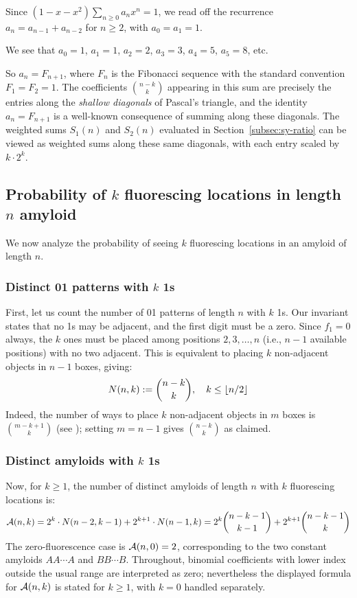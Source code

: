 \documentclass[referee,lineno,pdflatex,sn-mathphys-ay]{sn-jnl}
\DeclarePairedDelimiter\floor{\lfloor}{\rfloor}
\newcommand{\cA}{ {\cal A} }
\begin{document}
Since $(1-x-x^2)\sum_{n \ge 0} a_n x^n = 1$, we read off the recurrence $a_n = a_{n-1} + a_{n-2}$ for $n \ge 2$, with $a_0 = a_1 = 1$.

We see that $a_0 = 1$, $a_1 = 1$, $a_2 = 2$, $a_3 = 3$, $a_4 = 5$, $a_5 = 8$, etc.

So $a_n = F_{n+1}$, where $F_n$ is the Fibonacci sequence with the standard convention $F_1 = F_2 = 1$. The coefficients $\binom{n-k}{k}$ appearing in this sum are precisely the entries along the \textit{shallow diagonals} of Pascal's triangle, and the identity $a_n = F_{n+1}$ is a well-known consequence of summing along these diagonals. The weighted sums $S_1(n)$ and $S_2(n)$ evaluated in Section~\ref{subsec:sy-ratio} can be viewed as weighted sums along these same diagonals, with each entry scaled by $k \cdot 2^k$.

\subsection{Probability of $k$ fluorescing locations in length $n$ amyloid }

We now analyze the probability of seeing $k$ fluorescing locations in an amyloid of length $n$.


\subsubsection{Distinct 01 patterns with $k$ 1s}
First, let us count the number of 01 patterns of length $n$ with $k$ 1s. Our invariant states that no 1s may be adjacent, and the first digit must be a zero. Since $f_1 = 0$ always, the $k$ ones must be placed among positions $2, 3, \ldots, n$ (i.e., $n - 1$ available positions) with no two adjacent. This is equivalent to placing $k$ non-adjacent objects in $n - 1$ boxes, giving:
\[
N(n,k) := \binom{n-k}{k}, \quad k \leq \floor{n/2}
\]
Indeed, the number of ways to place $k$ non-adjacent objects in $m$ boxes is $\binom{m-k+1}{k}$ (see \citep[Exercise~1.34]{stanley2012}); setting $m = n - 1$ gives $\binom{n-k}{k}$ as claimed.


\subsubsection{Distinct amyloids with $k$ 1s}
Now, for $k \ge 1$, the number of distinct amyloids of length $n$ with $k$ fluorescing locations is:
\[
    \cA(n,k) = 2^k \cdot N(n-2,k-1) + 2^{k+1}  \cdot N(n-1,k) = 2^k \binom{n-k-1}{k-1} + 2^{k+1} \binom{n-k-1}{k}
\]
The zero-fluorescence case is $\cA(n,0) = 2$, corresponding to the two constant amyloids $AA\cdots A$ and $BB\cdots B$.
Throughout, binomial coefficients with lower index outside the usual range are interpreted as zero; nevertheless the displayed formula for $\cA(n,k)$ is stated for $k \ge 1$, with $k=0$ handled separately.
\end{document}
